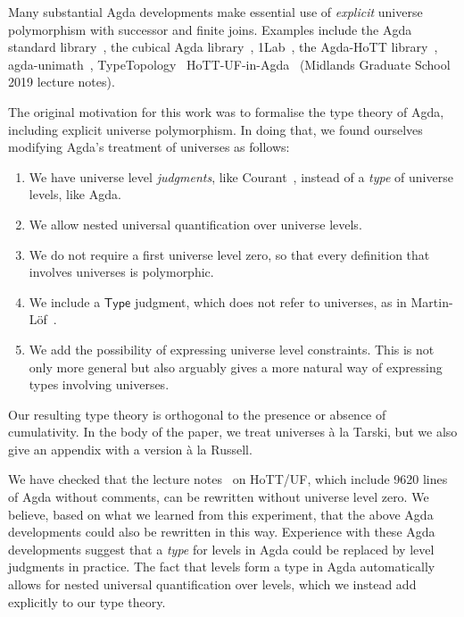 \documentclass[11pt,a4paper]{article}
\theoremstyle{definition}
\newcommand{\Type}{\mathsf{Type}}
\begin{document}
Many substantial Agda developments make essential use of \emph{explicit} universe polymorphism with successor and finite joins. Examples include the Agda standard library~\cite{agda:stdlib}, the cubical Agda library~\cite{cubical:agda}, 1Lab~\cite{agda:1lab}, the Agda-HoTT library~\cite{hott:agda}, agda-unimath~\cite{agda:unimath}, TypeTopology~\cite{TypeTopology}
HoTT-UF-in-Agda~\cite{hott:uf:in:agda} (Midlands Graduate School 2019 lecture notes).

The original motivation for this work was to formalise the type theory of Agda, including explicit universe polymorphism. In doing that, we found ourselves modifying Agda's treatment of universes as follows:
\begin{enumerate}
\item We have universe level \emph{judgments}, like Courant~\cite{Courant02}, instead of a \emph{type} of universe levels, like Agda.

 \item We allow nested universal quantification over universe levels.

 \item We do not require a first universe level zero, so that every definition that involves universes is polymorphic.

 \item We include a $\Type$ judgment, which does not refer to universes, as in Martin-L\"of~\cite{martinlof:hannover}.

 \item We add the possibility of expressing universe level constraints. This is not only more general but also arguably gives a more natural way of expressing types involving universes.

\end{enumerate}

Our resulting type theory is orthogonal to the presence or absence of cumulativity. In the body of the paper, we treat universes \`a la Tarski, but we also give an appendix with a version \`a la Russell.


We have checked that the lecture notes~\cite{hott:uf:in:agda} on HoTT/UF, which include 9620 lines of Agda without comments, can be rewritten without universe level zero. We believe, based on what we learned from this experiment, that the above Agda developments could also be rewritten in this way. Experience with these Agda developments suggest that a \emph{type} for levels in Agda could be replaced by level judgments in practice. The fact that levels form a type in Agda automatically allows for nested universal quantification over levels, which we instead add explicitly to our type theory.
\end{document}
